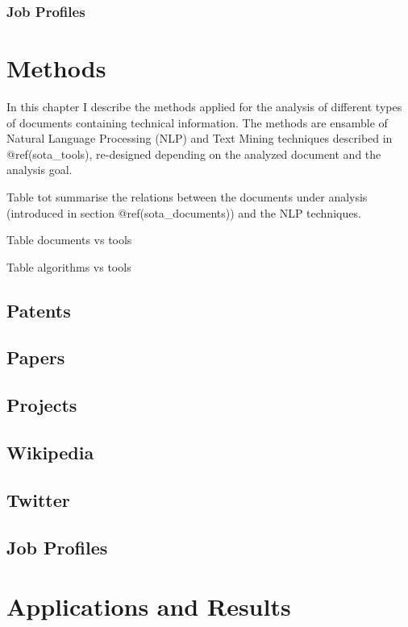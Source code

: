 \documentclass[]{book}
\begin{document}
\subsection{Job Profiles}\label{sotadocumentsjobs}

\chapter{Methods}\label{methods}

In this chapter I describe the methods applied for the analysis of
different types of documents containing technical information. The
methods are ensamble of Natural Language Processing (NLP) and Text
Mining techniques described in @ref(sota\_tools), re-designed depending
on the analyzed document and the analysis goal.

Table tot summarise the relations between the documents under analysis
(introduced in section @ref(sota\_documents)) and the NLP techniques.

Table documents vs tools

Table algorithms vs tools

\section{Patents}\label{patents}

\section{Papers}\label{papers}

\section{Projects}\label{projects}

\section{Wikipedia}\label{wikipedia}

\section{Twitter}\label{twitter}

\section{Job Profiles}\label{job-profiles}

\chapter{Applications and Results}\label{applications-and-results}
\end{document}
